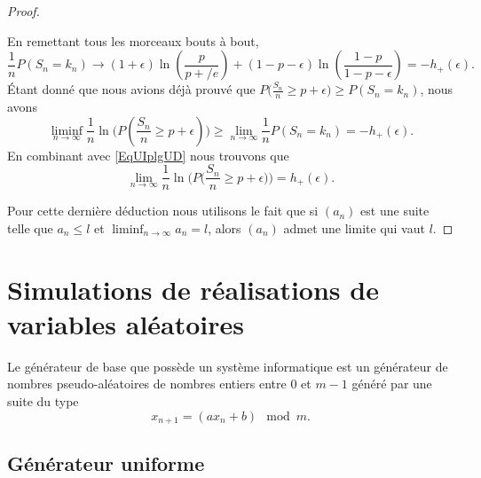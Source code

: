 \begin{proof}
\begin{enumerate}
	\end{enumerate}
	En remettant tous les morceaux bouts à bout,
	\begin{equation}
		\frac{1}{ n }P(S_n=k_n)\to (1+\epsilon)\ln\left( \frac{ p }{ p+/e } \right)+(1-p-\epsilon)\ln\left( \frac{ 1-p }{ 1-p-\epsilon } \right)=-h_+(\epsilon).
	\end{equation}
	Étant donné que nous avions déjà prouvé que \( P\big( \frac{ S_n }{ n }\geq p+\epsilon \big)\geq P(S_n=k_n)\), nous avons
	\begin{equation}
		\liminf_{n\to \infty}\frac{1}{ n }\ln\Big( P(\frac{ S_n }{ n }\geq p+\epsilon) \Big)\geq \lim_{n\to \infty} \frac{1}{ n }P(S_n=k_n)=-h_+(\epsilon).
	\end{equation}
	En combinant avec \eqref{EqUIplgUD} nous trouvons que
	\begin{equation}
		\lim_{n\to \infty} \frac{1}{ n }\ln\Big( P\big( \frac{ S_n }{ n }\geq p+\epsilon \big) \Big)=h_+(\epsilon).
	\end{equation}

	Pour cette dernière déduction nous utilisons le fait que si \( (a_n)\) est une suite telle que \( a_n\leq l\) et \( \liminf_{n\to\infty}a_n=l\), alors \( (a_n)\) admet une limite qui vaut \( l\).
\end{proof}

\section{Simulations de réalisations de variables aléatoires}

Le générateur de base que possède un système informatique est un générateur de nombres pseudo-aléatoires de nombres entiers entre \( 0\) et \( m-1\) généré par une suite du type
\begin{equation}
	x_{n+1}=(ax_n+b)\mod m.
\end{equation}

\subsection{Générateur uniforme}

